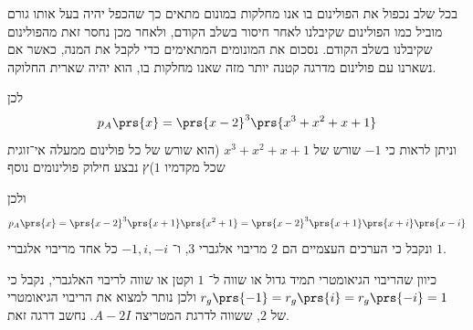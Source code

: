 \documentclass[a4paper,10pt,twoside,openany]{book}
\begin{document}
\begin{solution}
בכל שלב נכפול את הפולינום בו אנו מחלקות במונום מתאים כך שהכפל יהיה בעל אותו גורם מוביל כמו הפולינום שקיבלנו לאחר חיסור בשלב הקודם, ולאחר מכן נחסר זאת מהפולינום שקיבלנו בשלב הקודם. נסכום את המונומים המתאימים כדי לקבל את המנה, כאשר אם נשארנו עם פולינום מדרגה קטנה יותר מזה שאנו מחלקות בו, הוא יהיה שארית החלוקה.

\begin{center}
\end{center}

לכן
\[p_A\prs{x} = \prs{x-2}^3 \prs{x^3 + x^2 + x + 1}\]
וניתן לראות כי
$-1$
שורש של
$x^3 + x^2 + x + 1$
(הוא שורש של כל פולינום ממעלה אי־זוגית שכל מקדמיו
$1$)ץ
נבצע חילוק פולינומים נוסף

\begin{center}
\end{center}

ולכן
\[p_A\prs{x} = \prs{x-2}^3 \prs{x+1} \prs{x^2 + 1} = \prs{x-2}^3 \prs{x+1} \prs{x + i} \prs{x - i}\]
ונקבל כי הערכים העצמיים הם
$2$
מריבוי אלגברי
$3$,
ו־%
$-1, i, -i$
כל אחד מריבוי אלגברי
$1$.

כיוון שהריבוי הגיאומטרי תמיד גדול או שווה ל־%
$1$
וקטן או שווה לריבוי האלגברי, נקבל כי
$r_g\prs{-1} = r_g\prs{i} = r_g\prs{-i} = 1$
ולכן נותר למצוא את הריבוי הגיאומטרי של
$2$,
ששווה לדרגת המטריצה
$A - 2I$.
נחשב דרגה זאת.


\end{solution}
\end{document}
